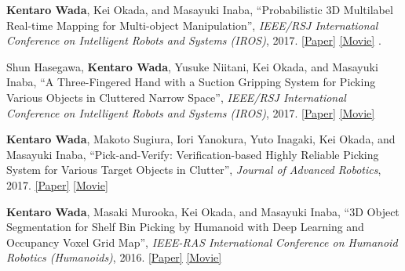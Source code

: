 \documentclass[letterpaper,MMMyyyy,nonstop]{simpleresumecv}
\begin{document}
\begin{body}
\BigGapNoBreak

\textbf{Kentaro Wada}, Kei Okada, and Masayuki Inaba,
``Probabilistic 3D Multilabel Real-time Mapping for Multi-object Manipulation'',
\textit{IEEE/RSJ International Conference on Intelligent Robots and Systems (IROS)}, 2017.
\href{https://drive.google.com/open?id=1frqieyHiQBqpr1e9mWPrzfaX8FbpLcuX}{\underline{[Paper]}}
\href{https://drive.google.com/open?id=1nUFB1_jHLomxAEhlWsgaMRkdGycB5Dhk}{\underline{[Movie]}}
.

\BigGapNoBreak

Shun Hasegawa, \textbf{Kentaro Wada}, Yusuke Niitani, Kei Okada, and Masayuki Inaba,
``A Three-Fingered Hand with a Suction Gripping System for Picking Various Objects in Cluttered Narrow Space'',
\textit{IEEE/RSJ International Conference on Intelligent Robots and Systems (IROS)}, 2017.
\href{https://drive.google.com/open?id=1JK_o178iRMlQUQQgIlBLlltsj7cwMDeE}{\underline{[Paper]}}
\href{https://drive.google.com/open?id=1JPzAq4B47cjH35bhAjGRFMXyUN7voO4o}{\underline{[Movie]}}

\BigGapNoBreak

\textbf{Kentaro Wada}, Makoto Sugiura, Iori Yanokura, Yuto Inagaki, Kei Okada, and Masayuki Inaba,
``Pick-and-Verify: Verification-based Highly Reliable Picking System for Various Target Objects in Clutter'',
\textit{Journal of Advanced Robotics}, 2017.
\href{http://www.tandfonline.com/doi/abs/10.1080/01691864.2016.1269672?journalCode=tadr20}{\underline{[Paper]}}
\href{http://www.tandfonline.com/doi/suppl/10.1080/01691864.2016.1269672?scroll=top}{\underline{[Movie]}}

\BigGapNoBreak

\textbf{Kentaro Wada}, Masaki Murooka, Kei Okada, and Masayuki Inaba,
``3D Object Segmentation for Shelf Bin Picking by Humanoid with Deep Learning and Occupancy Voxel Grid Map'',
\textit{IEEE-RAS International Conference on Humanoid Robotics (Humanoids)}, 2016.
\href{http://ieeexplore.ieee.org/document/7803415/}{\underline{[Paper]}}
\href{https://drive.google.com/open?id=19YwO1LXAcRCfS8rAM5paxc2SEzGE3odA}{\underline{[Movie]}}


\end{body}
\end{document}
